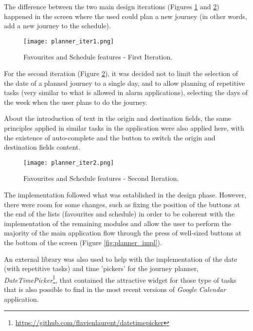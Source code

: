 The difference between the two main design iterations (Figures \ref{fig:planner_iter1} and \ref{fig:planner_iter2}) happened in the screen where the used could plan a new journey (in other words, add a new journey to the schedule).

\begin{figure}[h!]
  \begin{center}
    \leavevmode
    \texttt{[image: planner\_iter1.png]}
    \caption{Favourites and Schedule features - First Iteration.}
    \label{fig:planner_iter1}
  \end{center}
\end{figure}

For the second iteration (Figure \ref{fig:planner_iter2}), it was decided not to limit the selection of the date of a planned journey to a single day, and to allow planning of repetitive tasks (very similar to what is allowed in alarm applications), selecting the days of the week when the user plans to do the journey.

About the introduction of text in the origin and destination fields, the same principles applied in similar tasks in the application were also applied here, with the existence of auto-complete and the button to switch the origin and destination fields content.

\begin{figure}[h!]
  \begin{center}
    \leavevmode
    \texttt{[image: planner\_iter2.png]}
    \caption{Favourites and Schedule features - Second Iteration.}
    \label{fig:planner_iter2}
  \end{center}
\end{figure}

\newpage

The implementation followed what was established in the design phase. However, there were room for some changes, such as fixing the position of the buttons at the end of the lists (favourites and schedule) in order to be coherent with the implementation of the remaining modules and allow the user to perform the majority of the main application flow through the press of well-sized buttons at the bottom of the screen (Figure \ref{fig:planner_impl}).

An external library was also used to help with the implementation of the date (with repetitive tasks) and time 'pickers' for the journey planner, \emph{DateTimePicker}\footnote{\url{https://github.com/flavienlaurent/datetimepicker}}, that contained the attractive widget for those type of tasks that is also possible to find in the most recent versions of \emph{Google Calendar} application.

